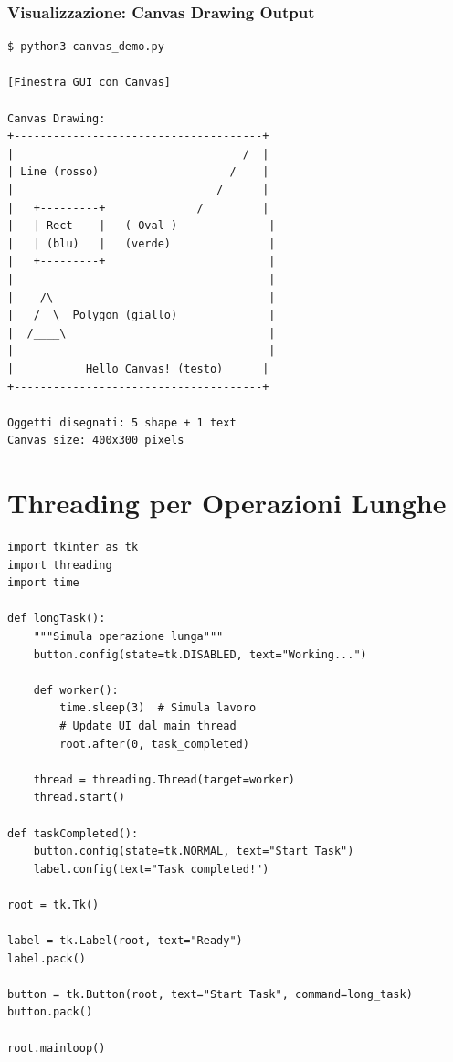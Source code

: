 \subsubsection{Visualizzazione: Canvas Drawing Output}

\begin{tcolorbox}[title=Output Terminale - Canvas Drawing]
\begin{verbatim}
$ python3 canvas_demo.py

[Finestra GUI con Canvas]

Canvas Drawing:
+--------------------------------------+
|                                   /  |
| Line (rosso)                    /    |
|                               /      |
|   +---------+              /         |
|   | Rect    |   ( Oval )              |
|   | (blu)   |   (verde)               |
|   +---------+                         |
|                                       |
|    /\                                 |
|   /  \  Polygon (giallo)              |
|  /____\                               |
|                                       |
|           Hello Canvas! (testo)      |
+--------------------------------------+

Oggetti disegnati: 5 shape + 1 text
Canvas size: 400x300 pixels
\end{verbatim}
\end{tcolorbox}

\section{Threading per Operazioni Lunghe}

\begin{lstlisting}
import tkinter as tk
import threading
import time

def longTask():
    """Simula operazione lunga"""
    button.config(state=tk.DISABLED, text="Working...")

    def worker():
        time.sleep(3)  # Simula lavoro
        # Update UI dal main thread
        root.after(0, task_completed)

    thread = threading.Thread(target=worker)
    thread.start()

def taskCompleted():
    button.config(state=tk.NORMAL, text="Start Task")
    label.config(text="Task completed!")

root = tk.Tk()

label = tk.Label(root, text="Ready")
label.pack()

button = tk.Button(root, text="Start Task", command=long_task)
button.pack()

root.mainloop()
\end{lstlisting}

